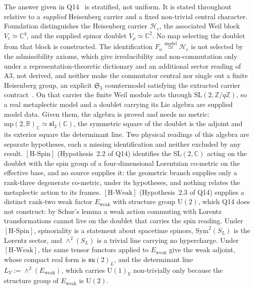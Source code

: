 \documentclass[11pt,a4paper]{article}
\theoremstyle{definition}
\newcommand{\su}{\mathfrak{su}}
\newcommand{\UU}{\mathrm{U}}
\newcommand{\SL}{\mathrm{SL}}
\newcommand{\Vr}{V_\rho}
\newcommand{\Ew}{E_{\mathrm{weak}}}
\newcommand{\HSpin}{\ensuremath{[\mathrm{H\text{-}Spin}]}}
\newcommand{\HWeak}{\ensuremath{[\mathrm{H\text{-}Weak}]}}
\begin{document}
    \medskip
    The answer given in Q14~\cite{Beau2026q14} is stratified, not uniform.
    It is stated throughout relative to a \emph{supplied} Heisenberg carrier and a fixed non-trivial
    central character.
    Foundation distinguishes the Heisenberg carrier $\mathcal{H}_c$, the associated Weil block
    $V_c \simeq \mathbb{C}^q$, and the supplied spinor doublet $\Vr \simeq \mathbb{C}^2$.
    No map selecting the doublet from that block is constructed.
    The identification $F_n \overset{\mathrm{model}}{\simeq} \mathcal{H}_c$ is not selected by the admissibility
    axioms, which give irreducibility and non-commutation only under a representation-theoretic dictionary and
    an additional sector reading of A3, not derived, and neither make the commutator central
    nor single out a finite Heisenberg group, an explicit $\mathfrak{S}_3$ countermodel satisfying
    the extracted carrier contract~\cite{Beau2026m, Beau2026HeisenbergStructure}.
    On that carrier the finite Weil module acts through $\SL(2,\mathbb{Z}/q\mathbb{Z})$, so a real metaplectic
    model and a doublet carrying its Lie algebra are supplied model data.
    Given them, the algebra is proved and needs no metric: $\mathrm{mp}(2,\mathbb{R})_\mathbb{C} \simeq
    \mathfrak{sl}_2(\mathbb{C})$, the symmetric square of the doublet is the adjoint and its exterior square the
    determinant line.
    Two physical readings of this algebra are separate hypotheses, each a missing identification and neither
    excluded by any result.
    \HSpin{} (Hypothesis~2.2 of Q14) identifies the $\SL(2,\mathbb{C})$ acting on the doublet with the spin group of
    a four-dimensional Lorentzian co-metric on the effective base, and no source supplies it: the geometric branch
    supplies only a rank-three degenerate co-metric, under its hypotheses, and nothing relates the metaplectic
    action to its
    frames.
    \HWeak{} (Hypothesis~2.3 of Q14) supplies a distinct rank-two weak factor $\Ew$ with structure group $\UU(2)$,
    which Q14 does not construct: by Schur's lemma a weak action commuting with Lorentz transformations cannot live
    on the doublet that carries the spin reading.
    Under \HSpin{}, spinoriality is a statement about spacetime spinors, $\mathrm{Sym}^2(S_L)$ is the Lorentz sector,
    and $\wedge^2(S_L)$ is a trivial line carrying no hypercharge.
    Under \HWeak{}, the same tensor functors applied to $\Ew$ give the weak adjoint, whose compact real form is
    $\su(2)_L$, and the determinant line $L_Y := \wedge^2(\Ew)$, which carries $\UU(1)_Y$ non-trivially only because
    the structure group of $\Ew$ is $\UU(2)$.
\end{document}
